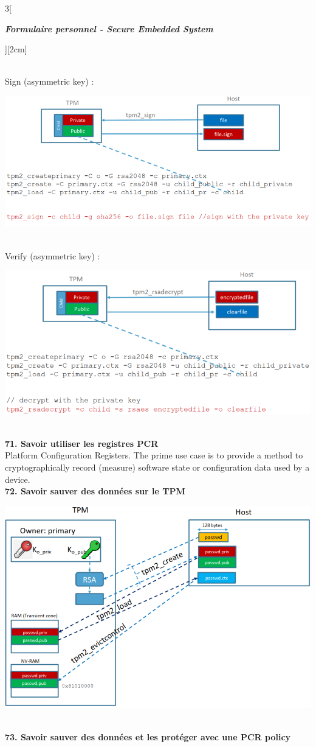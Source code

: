 \begin{multicols}{3}[\centerline{ \large\em \textbf{Formulaire personnel - Secure Embedded System}}][2cm]
\begin{minipage}{\linewidth}
\end{minipage}\\
Sign (asymmetric key) :\\
\begin{minipage}{\linewidth}
	\centering
    \includegraphics[width =0.6\columnwidth]{images/55.png}
\end{minipage}\\
Verify (asymmetric key) :\\
\begin{minipage}{\linewidth}
	\centering
    \includegraphics[width =0.6\columnwidth]{images/54.png}
\end{minipage}\\
\textbf{71. Savoir utiliser les registres PCR\\}
Platform Configuration Registers. The prime use case is to provide a method to cryptographically record (measure) software state or configuration data used by a device. \\ 
\textbf{72. Savoir sauver des données sur le TPM\\}
\begin{minipage}{\linewidth}
	\centering
    \includegraphics[width =0.6\columnwidth]{images/50.png}
\end{minipage}
\\ \textbf{73. Savoir sauver des données et les protéger avec une PCR policy\\}

\end{multicols}
